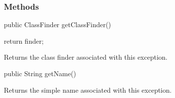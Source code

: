 \subsubsection* {Methods}
\begin{code}

   public ClassFinder getClassFinder()\begin{hide} {
      return finder;
   }\end{hide}
\end{code}
\begin{tabb}   Returns the class finder associated with
 this exception.
\end{tabb}
\begin{htmlonly}
\end{htmlonly}
\begin{code}

   public String getName()\begin{hide} {
      return name;
   }
}\end{hide}
\end{code}
\begin{tabb}   Returns the simple name associated with
 this exception.
\end{tabb}
\begin{htmlonly}
\end{htmlonly}
